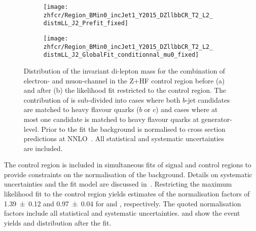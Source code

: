 
\begin{figure}[htbp]
  \centering


  \begin{subfigure}{.485\textwidth}
    \texttt{[image: zhfcr/Region\_BMin0\_incJet1\_Y2015\_DZllbbCR\_T2\_L2\_distmLL\_J2\_Prefit\_fixed]}
    \label{fig:zcr_mll_prefit}
  \end{subfigure}\hfill%
  \begin{subfigure}{.485\textwidth}
    \texttt{[image: zhfcr/Region\_BMin0\_incJet1\_Y2015\_DZllbbCR\_T2\_L2\_distmLL\_J2\_GlobalFit\_conditionnal\_mu0\_fixed]}
    \label{fig:zcr_mll_postfit}
  \end{subfigure}

  \caption{Distribution of the invariant di-lepton mass for the
    combination of electron- and muon-channel in the Z+HF control
    region before (a) and after (b) the likelihood fit restricted to
    the control region. The contribution of \Zjets is sub-divided into
    cases where both $b$-jet candidates are matched to heavy flavour
    quarks ($b$ or $c$) and cases where at most one candidate is
    matched to heavy flavour quarks at generator-level. Prior to the
    fit the \Zjets background is normalised to cross section
    predictions at NNLO~\cite{Anastasiou:2003ds}. All statistical and
    systematic uncertainties are included.}
\end{figure}

The \ZHF control region is included in simultaneous fits of signal and
control regions to provide constraints on the normalisation of the
\ZHF background. Details on systematic uncertainties and the fit model
are discussed
in~. Restricting the
maximum likelihood fit to the control region yields estimates of the
normalisation factors of \num{1.39 \pm 0.12} and \num{0.97 \pm 0.04}
for \ZHF and \ttbar, respectively. The quoted normalisation factors
include all statistical and systematic
uncertainties.  and 
show the event yields and \mll distribution after the fit.



